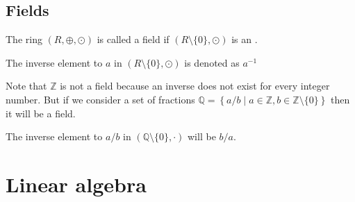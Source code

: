 \begin{appendices}
\subsection{Fields}

\begin{definition}[Field]
  The ring $\left(R, \oplus, \odot\right)$ is called a field if
  $\left(R \setminus \{0\}, \odot\right)$ is an .

  The inverse element to $a$ in
  $\left(R \setminus\{0\}, \odot\right)$ is denoted as $a^{-1}$
  \label{def:field}
\end{definition}

\begin{example}
  Note that $\mathbb{Z}$ is not a field because an inverse does not exist for every integer
  number. But if we consider a set of fractions
  $\mathbb{Q} = \left\{a/b \mid a \in \mathbb{Z}, b \in
  \mathbb{Z}\setminus\{0\}\right\}$ then it will be a field.

  The
  inverse element to $a/b$  in
  $\left(\mathbb{Q}\setminus\{0\}, \cdot\right)$  will be $b/a$.
  \label{ex:field}
\end{example}

\section{Linear algebra}


\end{appendices}
